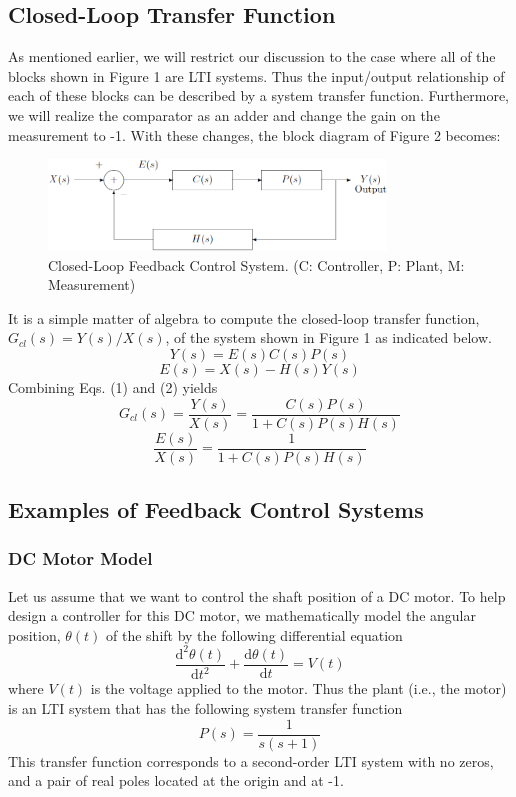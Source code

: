\documentclass[a4paper]{article}
\begin{document}
\subsection{Closed-Loop Transfer Function}
As mentioned earlier, we will restrict our discussion to the case where all of the blocks shown in Figure 1 are LTI systems. Thus the input/output relationship of each of these blocks can be described by a system transfer function. Furthermore, we will realize the comparator as an adder and change the gain on the measurement to -1. With these changes, the block diagram of Figure 2 becomes:
\begin{figure}[H]
    \begin{center}
        \includegraphics[width=0.8\textwidth]{2.png}
    \end{center}
    \caption{Closed-Loop Feedback Control System. (C: Controller, P: Plant, M: Measurement)}
\end{figure}
It is a simple matter of algebra to compute the closed-loop transfer function, $G_{cl}(s)=Y(s)/X(s)$, of the system shown in Figure 1 as indicated below.
\begin{equation}
    Y(s)=E(s)C(s)P(s)
\end{equation}
\begin{equation}
    E(s)=X(s)-H(s)Y(s)
\end{equation}
Combining Eqs. (1) and (2) yields
\begin{equation}
    G_{cl}(s)=\frac{Y(s)}{X(s)}=\frac{C(s)P(s)}{1+C(s)P(s)H(s)}
\end{equation}
\begin{equation}
    \frac{E(s)}{X(s)}=\frac{1}{1+C(s)P(s)H(s)}
\end{equation}
\subsection{Examples of Feedback Control Systems}
\subsubsection{DC Motor Model}
Let us assume that we want to control the shaft position of a DC motor. To help design a controller for this DC motor, we mathematically model the angular position, $\theta(t)$ of the shift by the following differential equation
\begin{equation}
    \frac{\mathrm{d}^2\theta(t)}{\mathrm{d}t^2}+\frac{\mathrm{d}\theta(t)}{\mathrm{d}t}=V(t)
\end{equation}
where $V(t)$ is the voltage applied to the motor. Thus the plant (i.e., the motor) is an LTI system that has the following system transfer function
\begin{equation}
    P(s)=\frac{1}{s(s+1)}
\end{equation}
This transfer function corresponds to a second-order LTI system with no zeros, and a pair of real poles located at the origin and at -1.
\end{document}
